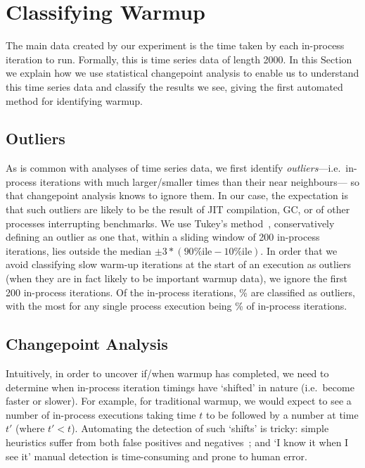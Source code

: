 \documentclass[acmlarge]{acmart}\settopmatter{printfolios=true}
\begin{document}
\section{Classifying Warmup}
\label{sec:stats}

The main data created by our experiment is the time taken by each in-process
iteration to run. Formally, this is time series data of length 2000. In
this Section we explain how we use statistical changepoint analysis to enable us to
understand this time series data and classify the results we see, giving the
first automated method for identifying warmup.


\subsection{Outliers}

As is common with analyses of time series data, we first identify
\emph{outliers}---i.e.~in-process iterations with much larger/smaller times than their near
neighbours--- so that changepoint analysis knows to ignore them. In our case, the
expectation is that such outliers are likely to be the result of JIT compilation,
GC, or of other processes interrupting benchmarks. We use Tukey's
method~\cite{tukey1977exploratory}, conservatively defining an outlier as one that, within a
sliding window of 200 in-process iterations, lies outside the median $\pm
3*(90\%\textrm{ile} - 10\%\textrm{ile})$. In order that we avoid classifying
slow warm-up iterations at the start of an execution as outliers (when they are
in fact likely to be important warmup data), we ignore the first 200 in-process
iterations. Of the \totaliterations\xspace in-process
iterations, \totaloutlierspercentage\% are classified as outliers, with the most for
%
any single process execution being \result\% of in-process iterations.


\subsection{Changepoint Analysis}

Intuitively, in order to uncover if/when warmup has completed, we need to
determine when in-process iteration timings have `shifted' in nature (i.e.~become
faster or slower). For example, for traditional warmup, we would expect to see a
number of in-process executions taking time $t$ to be followed by a number at
time $t'$ (where $t' < t$). Automating the detection of such `shifts' is
tricky: simple heuristics suffer from both false positives and negatives~\cite{kalibera13rigorous}; and
`I know it when I see it' manual detection is time-consuming and prone to human
error.
\end{document}
